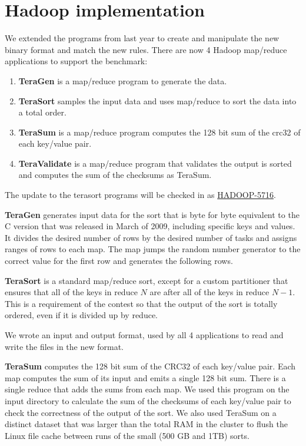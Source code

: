 \documentclass{article}
\begin{document}
\section{Hadoop implementation}

We extended the programs from last year to create and manipulate the
new binary format and match the new rules. There are now 4 Hadoop
map/reduce applications to support the benchmark:
\begin{enumerate}
\item \textbf{TeraGen} is a map/reduce program to generate the data.
\item \textbf{TeraSort} samples the input data and uses map/reduce to
  sort the data into a total order.
\item \textbf{TeraSum} is a map/reduce program computes the 128 bit
  sum of the crc32 of each key/value pair.
\item \textbf{TeraValidate} is a map/reduce program that validates the
  output is sorted and computes the sum of the checksums as TeraSum.
\end{enumerate}
The update to the terasort programs will be checked in as
\href{http://issues.apache.org/jira/browse/HADOOP-5716}{HADOOP-5716}.

\textbf{TeraGen} generates input data for the sort that is byte for byte
equivalent to the C version that was released in March of 2009,
including specific keys and values. It divides the desired number of
rows by the desired number of tasks and assigns ranges of rows to each
map. The map jumps the random number generator to the correct value
for the first row and generates the following rows.

\textbf{TeraSort} is a standard map/reduce sort, except for a custom
partitioner that ensures that all of the keys in reduce $N$ are after
all of the keys in reduce $N-1$. This is a requirement of the contest
so that the output of the sort is totally ordered, even if it is
divided up by reduce.

We wrote an input and output format, used by all 4 applications to
read and write the files in the new format.

\textbf{TeraSum} computes the 128 bit sum of the CRC32 of each
key/value pair. Each map computes the sum of its input and emits a
single 128 bit sum. There is a single reduce that adds the sums from
each map. We used this program on the input directory to calculate the
sum of the checksums of each key/value pair to check the correctness
of the output of the sort. We also used TeraSum on a distinct dataset
that was larger than the total RAM in the cluster to flush the Linux
file cache between runs of the small (500 GB and 1TB) sorts.
\end{document}
